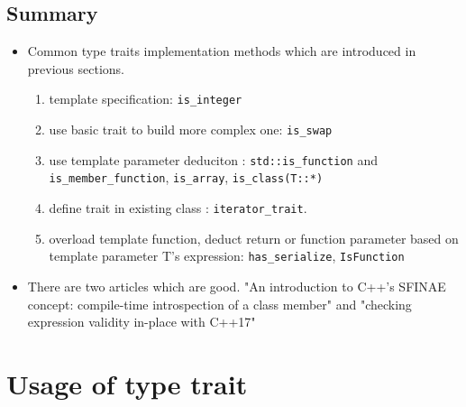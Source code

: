 \documentclass[a4paper,11pt,twoside]{book}
\begin{document}
\subsection{Summary}
\begin{itemize}
	\item Common type traits implementation methods which are introduced in previous sections. 
	\begin{enumerate}
		\item template specification: \texttt{is\_integer}
		\item use basic trait to build more complex one: \texttt{is\_swap}
		\item use template parameter deduciton : \texttt{std::is\_function} and
		\texttt{is\_member\_function}, \texttt{is\_array}, \texttt{is\_class(T::*)}
		\item define trait in existing class : \texttt{iterator\_trait}.
		\item overload template function, deduct return or function parameter based on template parameter T's expression:  \texttt{has\_serialize}, \texttt{IsFunction}
	\end{enumerate}

	\item There are two articles which are good.
"An introduction to C++'s SFINAE concept: compile-time introspection of a class member" and "checking expression validity in-place with C++17"
\end{itemize}

\section{Usage of type trait}
\end{document}
